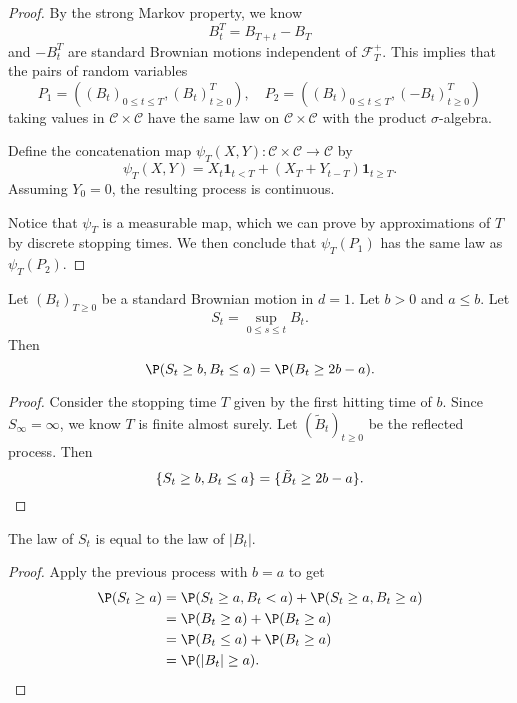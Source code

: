 \documentclass[a4paper]{article}
\begin{document}
\begin{proof}
  By the strong Markov property, we know
  \[
    B^T_t = B_{T + t} - B_T
  \]
  and $-B_t^T$ are standard Brownian motions independent of $\mathcal{F}_T^+$. This implies that the pairs of random variables
  \[
    P_1 = ((B_t)_{0 \leq t \leq T}, (B_t)^T_{t \geq 0}),\quad P_2 = ((B_t)_{0 \leq t \leq T}, (-B_t)^T_{t \geq 0})
  \]
  taking values in $\mathcal{C} \times \mathcal{C}$ have the same law on $\mathcal{C} \times \mathcal{C}$ with the product $\sigma$-algebra.

  Define the concatenation map $\psi_T(X, Y): \mathcal{C} \times \mathcal{C} \to \mathcal{C}$ by
  \[
    \psi_T(X, Y) = X_t \mathbf{1}_{t < T} + (X_T + Y_{t - T}) \mathbf{1}_{t \geq T}.
  \]
  Assuming $Y_0 = 0$, the resulting process is continuous.

  Notice that $\psi_T$ is a measurable map, which we can prove by approximations of $T$ by discrete stopping times. We then conclude that $\psi_T(P_1)$ has the same law as $\psi_T(P_2)$.
\end{proof}

\begin{cor}
  Let $(B_t)_{T \geq 0}$ be a standard Brownian motion in $d = 1$. Let $b > 0$ and $a \leq b$. Let
  \[
    S_t = \sup_{0 \leq s \leq t} B_t.
  \]
  Then
  \[
    \P(S_t \geq b, B_t \leq a) = \P(B_t \geq 2b - a).
  \]
\end{cor}

\begin{proof}
  Consider the stopping time $T$ given by the first hitting time of $b$. Since $S_\infty = \infty$, we know $T$ is finite almost surely. Let $(\tilde{B}_t)_{t\geq 0}$ be the reflected process. Then
  \[
    \{S_t \geq b, B_t \leq a\} = \{\tilde{B}_t \geq 2b - a \}.\qedhere
  \]
\end{proof}

\begin{cor}
  The law of $S_t$ is equal to the law of $|B_t|$.
\end{cor}

\begin{proof} Apply the previous process with $b = a$ to get
  \begin{align*}
    \P(S_t \geq a) &= \P(S_t \geq a, B_t < a) + \P(S_t \geq a, B_t \geq a)\\
    &= \P(B_t \geq a) + \P(B_t \geq a)\\
    &= \P(B_t \leq a) + \P(B_t \geq a)\\
    &= \P(|B_t| \geq a).\qedhere
  \end{align*}
\end{proof}
\end{document}
